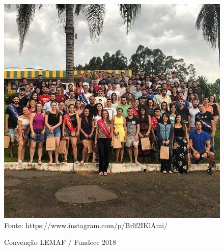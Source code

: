 \begin{figure}[H]
\centering
\caption{Convenção LEMAF / Fundecc 2018} %
\includegraphics[scale=0.5]{convensao}\\  %
{\small Fonte: https://www.instagram.com/p/Brlf2IKlAmi/} %
\label{fig:exemplo} %
\end{figure}
    